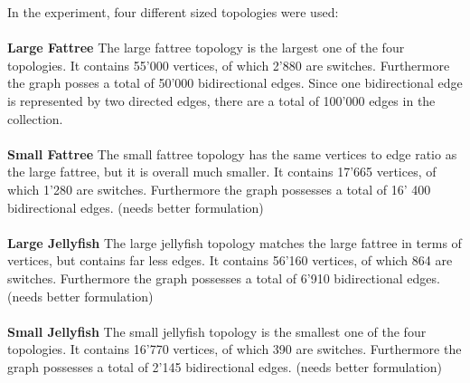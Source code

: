 \documentclass[11pt,singlecolumn]{scrartcl}
\begin{document}
In the experiment, four different sized topologies were used:\\\\
\textbf{Large Fattree} \quad  The large fattree topology is the largest one of the four topologies. It contains 55'000 vertices, of which 2'880 are switches. Furthermore the graph posses a total of 50'000 bidirectional edges. Since one bidirectional edge is represented by two directed edges, there are a total of 100'000 edges in the collection.\\\\
\textbf{Small Fattree} \quad The small fattree topology has the same vertices to edge ratio as the large fattree, but it is overall much smaller. It contains 17'665 vertices, of which 1'280 are switches. Furthermore the graph possesses a total of 16' 400 bidirectional edges. (needs better formulation) \\\\
\textbf{Large Jellyfish} \quad  The large jellyfish topology matches the large fattree in terms of vertices, but contains far less edges. It contains 56'160 vertices, of which 864 are switches. Furthermore the graph possesses a total of 6'910 bidirectional edges. (needs better formulation)\\\\
\textbf{Small Jellyfish} \quad The small jellyfish topology is the smallest one of the four topologies. It contains 16'770 vertices, of which 390 are switches. Furthermore the graph possesses a total of 2'145 bidirectional edges. (needs better formulation)
\end{document}
